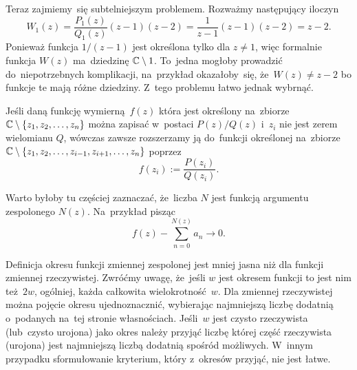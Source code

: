 \documentclass[a4paper,11pt]{article}
\begin{document}
Teraz zajmiemy~się subtelniejszym problemem. Rozważmy następujący
iloczyn
\begin{equation}
  \label{eq:Leja-Funkcje-zespolone-35}
  W_{ 1 }( z ) =
  \frac{ P_{ 1 }( z ) }{ Q_{ 1 }( z ) } ( z - 1 ) ( z - 2 ) =
  \frac{ 1 }{ z - 1 } ( z - 1 ) ( z - 2 ) =
  z - 2.
\end{equation}
Ponieważ funkcja $1 / ( z - 1 )$ jest określona tylko dla $z \neq 1$,
więc formalnie funkcja $W( z )$ ma~dziedzinę $\mathbb{C} \setminus 1$.
To~jedna mogłoby prowadzić do~niepotrzebnych komplikacji, na~przykład
okazałoby~się, że~$W( z ) \neq z - 2$ bo funkcje te mają różne
dziedziny. Z~tego problemu łatwo jednak wybrnąć.

Jeśli daną funkcję wymierną~$f( z )$ która jest określony na~zbiorze
$\mathbb{C} \setminus \{ z_{ 1 }, z_{ 2 }, \ldots, z_{ n } \}$ można zapisać
w~postaci $P( z ) / Q( z )$ i~$z_{ i }$ nie jest zerem wielomianu $Q$,
wówczas zawsze rozszerzamy ją do~funkcji określonej na~zbiorze
$\mathbb{C} \setminus \{ z_{ 1 }, z_{ 2 }, \ldots, z_{ i - 1 }, z_{ i + 1 }, \ldots,
z_{ n } \}$ poprzez
\begin{equation}
  \label{eq:Leja-Funkcje-zespolone-36}
  f( z_{ i } ) := \frac{ P( z_{ i } ) }{ Q( z_{ i } ) }.
\end{equation}

\vspace{\spaceFour}





\noindent
{} Warto byłoby tu częściej zaznaczać, że~liczba $N$ jest funkcją
argumentu zespolonego $N( z )$. Na~przykład pisząc
\begin{equation}
  \label{eq:Leja-Funkcje-zespolone-37}
  f( z ) - \sum_{ n = 0 }^{ N( z ) } a_{ n } \to 0.
\end{equation}

\vspace{\spaceFour}





\noindent
{} Definicja okresu funkcji zmiennej zespolonej jest mniej jasna
niż dla funkcji zmiennej rzeczywistej. Zwróćmy uwagę, że~jeśli $w$ jest
okresem funkcji to jest nim też~$2w$, ogólniej, każda całkowita
wielokrotność~$w$. Dla zmiennej rzeczywistej można pojęcie okresu
ujednoznacznić, wybierając najmniejszą liczbę dodatnią o~podanych na~tej
stronie własnościach. Jeśli~$w$ jest czysto rzeczywista (lub~czysto
urojona) jako okres należy przyjąć liczbę której część rzeczywista
(urojona) jest najmniejszą liczbą dodatnią spośród możliwych. W~innym
przypadku sformułowanie kryterium, który z~okresów przyjąć, nie jest łatwe.
\end{document}
